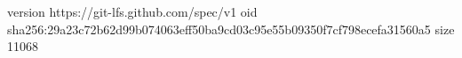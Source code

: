 version https://git-lfs.github.com/spec/v1
oid sha256:29a23c72b62d99b074063eff50ba9cd03c95e55b09350f7cf798ecefa31560a5
size 11068
